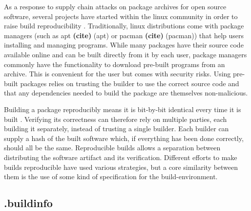 \documentclass[english, biblatex, digitaloutput]{kththesis}
\begin{document}
As a response to supply chain attacks on package archives for open source software, several projects have started within the linux community in order to raise build reproducibility \cite{reproducible_builds_project}. Traditionally, linux distributions come with package managers (such as apt \textbf{(cite)} (apt) or pacman \textbf{(cite)} (pacman)) that help users installing and managing programs. While many packages have their source code available online and can be built directly from it by each user, package managers commonly have the functionality to download pre-built programs from an archive. This is convenient for the user but comes with security risks. Using pre-built packages relies on trusting the builder to use the correct source code and that any dependencies needed to build the package are themselves non-malicious.

Building a package reproducibly means it is bit-by-bit identical every time it is built \cite{lamb_reproducible_2021}. Verifying its correctness can therefore rely on multiple parties, each building it separately, instead of trusting a single builder. Each builder can supply a hash of the built software which, if everything has been done correctly, should all be the same. Reproducible builds allows a separation between distributing the software artifact and its verification. Different efforts to make builds reproducible have used various strategies, but a core similarity between them is the use of some kind of specification for the build-environment.





\subsection{.buildinfo}
\end{document}

